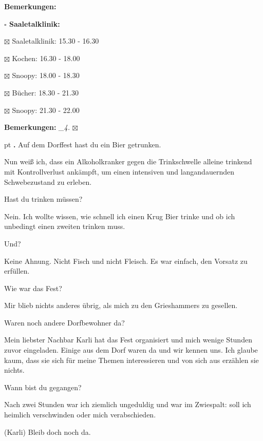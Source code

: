 \documentclass[10pt,a4paper]{article}
\newcounter{notec}
\newcommand\notep[1]{%
  \stepcounter{notec}
  \vskip #1pt
  {\bf\arabic{notec}.}
}
\newcommand\prop[1] {{\color {alizarin} {\bf #1}}}             %
\newcommand\mand[1] {{\color {burntorange} {\bf #1}}}          %
\newcommand\bottomspace{\vskip 4pt}
\newcommand\n[1] { {\sl #1.} \hskip 5pt }
\begin{document}
\begin{mdframed}[style=daystyle]
\begin{labeling}{{\mand {Bemerkungen:}}}
\begin{minipage}{0.75\textwidth}
\begin{labeling}{\prop {$\square$ {Saaletalklinik:}}}
      \item[$\boxtimes$ Saaletalklinik:] 15.30 - 16.30
      \item[$\boxtimes$ Kochen:]         16.30 - 18.00
      \item[$\boxtimes$ Snoopy:]         18.00 - 18.30
      \item[$\boxtimes$ Bücher:]         18.30 - 21.30
      \item[$\boxtimes$ Snoopy:]         21.30 - 22.00        
      \end{labeling}
    \end{minipage}
    \bottomspace
  \item[{\mand {Bemerkungen:}}]   \n{\_4} $\boxtimes$
  \end{labeling}
    
  \setcounter{notec}{0}

  \notep 0 Auf dem Dorffest hast du ein Bier getrunken.

  \vskip 2pt
  Nun weiß ich, dass ein Alkoholkranker gegen die Trinkschwelle alleine trinkend
  mit Kontrollverlust ankämpft, um einen intensiven und langandauernden Schwebezustand zu erleben.

  \vskip 2pt
  Hast du trinken müssen?

  \vskip 2pt
  Nein. Ich wollte wissen, wie schnell ich einen Krug Bier trinke und ob ich
  unbedingt einen zweiten trinken muss.

  \vskip 2pt
  Und?

  \vskip 2pt
  Keine Ahnung. Nicht Fisch und nicht Fleisch. Es war einfach, den Vorsatz zu
  erfüllen.

  \vskip 2pt
  Wie war das Fest?

  \vskip 2pt
  Mir blieb nichts anderes übrig, als mich zu den Grieshammers zu gesellen.

  \vskip 2pt
  Waren noch andere Dorfbewohner da?

  \vskip 2pt
  Mein liebster Nachbar Karli hat das Fest organisiert und mich wenige Stunden
  zuvor eingeladen. Einige aus dem Dorf waren da und wir kennen uns. Ich glaube
  kaum, dass sie sich für meine Themen interessieren und von sich aus erzählen
  sie nichts.

  \vskip 2pt
  Wann bist du gegangen?

  \vskip 2pt
  Nach zwei Stunden war ich ziemlich ungeduldig und war im Zwiespalt: soll ich
  heimlich verschwinden oder mich verabschieden.

  \vskip 2pt
  (Karli)
  Bleib doch noch da.


\end{mdframed}
\end{document}

